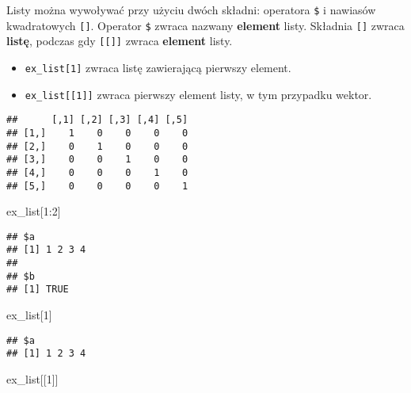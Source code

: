\documentclass[
]{article}
\newenvironment{Shaded}{\begin{snugshade}}{\end{snugshade}}
\newcommand{\CommentTok}[1]{\textcolor[rgb]{0.56,0.35,0.01}{\textit{#1}}}
\newcommand{\DecValTok}[1]{\textcolor[rgb]{0.00,0.00,0.81}{#1}}
\newcommand{\NormalTok}[1]{#1}
\newcommand{\SpecialCharTok}[1]{\textcolor[rgb]{0.00,0.00,0.00}{#1}}
\providecommand{\tightlist}{%
  \setlength{\itemsep}{0pt}\setlength{\parskip}{0pt}}
\begin{document}
Listy można wywoływać przy użyciu dwóch składni: operatora \texttt{\$} i
nawiasów kwadratowych \texttt{{[}{]}}. Operator \texttt{\$} zwraca
nazwany \textbf{element} listy. Składnia \texttt{{[}{]}} zwraca
\textbf{listę}, podczas gdy \texttt{{[}{[}{]}{]}} zwraca
\textbf{element} listy.

\begin{itemize}
\tightlist
\item
  \texttt{ex\_list{[}1{]}} zwraca listę zawierającą pierwszy element.
\item
  \texttt{ex\_list{[}{[}1{]}{]}} zwraca pierwszy element listy, w tym
  przypadku wektor.
\end{itemize}

\begin{Shaded}
\end{Shaded}

\begin{verbatim}
##      [,1] [,2] [,3] [,4] [,5]
## [1,]    1    0    0    0    0
## [2,]    0    1    0    0    0
## [3,]    0    0    1    0    0
## [4,]    0    0    0    1    0
## [5,]    0    0    0    0    1
\end{verbatim}

\begin{Shaded}
\begin{Highlighting}[]
\NormalTok{ex\_list[}\DecValTok{1}\SpecialCharTok{:}\DecValTok{2}\NormalTok{]}
\end{Highlighting}
\end{Shaded}

\begin{verbatim}
## $a
## [1] 1 2 3 4
## 
## $b
## [1] TRUE
\end{verbatim}

\begin{Shaded}
\begin{Highlighting}[]
\NormalTok{ex\_list[}\DecValTok{1}\NormalTok{]}
\end{Highlighting}
\end{Shaded}

\begin{verbatim}
## $a
## [1] 1 2 3 4
\end{verbatim}

\begin{Shaded}
\begin{Highlighting}[]
\NormalTok{ex\_list[[}\DecValTok{1}\NormalTok{]]}
\end{Highlighting}
\end{Shaded}
\end{document}
